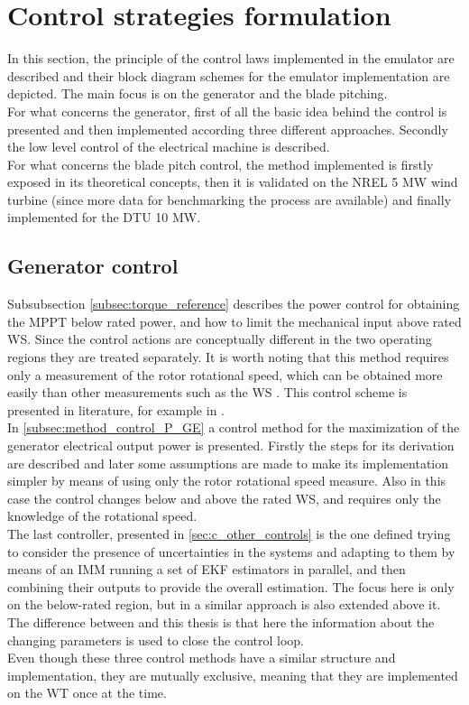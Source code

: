 \newpage
\section{Control strategies formulation}\label{sec:c_basic_model_control}
In this section, the principle of the control laws implemented in the emulator are described and their block diagram schemes for the emulator implementation are depicted. The main focus is on the generator and the blade pitching. \\
For what concerns the generator, first of all the basic idea behind the control is presented and then implemented according three different approaches. Secondly the low level control of the electrical machine is described.\\
For what concerns the blade pitch control, the method implemented is firstly exposed in its theoretical concepts, then it is validated on the NREL 5 MW wind turbine (since more data for benchmarking the process are available) and finally implemented for the DTU 10 MW.   

\subsection{Generator control}
Subsubsection \ref{subsec:torque_reference} describes the power control for obtaining the MPPT below rated power, and how to limit the mechanical input above rated WS. Since the control actions are conceptually different in the two operating regions they are treated separately. It is worth noting that this method requires only a measurement of the rotor rotational speed, which can be obtained more easily than other measurements such as the WS \cite{kalman_based_IMM}. This control scheme is presented in literature, for example in \cite{DTU_Wind_Energy_E_0028}. \\
In \autoref{subsec:method_control_P_GE} a control method for the maximization of the generator electrical output power is presented. Firstly the steps for its derivation are described and later some assumptions are made to make its implementation simpler by means of using only the rotor rotational speed measure. Also in this case the control changes below and above the rated WS, and requires only the knowledge of the rotational speed.\\
The last controller, presented in \autoref{sec:c_other_controls} is the one defined trying to consider the presence of uncertainties in the systems and adapting to them by means of an IMM running a set of \acrfull{EKF} estimators in parallel, and then combining their outputs to provide the overall estimation. The focus here is only on the below-rated region, but in \cite{kalman_based_IMM} a similar approach is also extended above it. The difference between \cite{kalman_based_IMM} and this thesis is that here the information about the changing parameters is used to close the control loop. \\
Even though these three control methods have a similar structure and implementation, they are mutually exclusive, meaning that they are implemented on the WT once at the time.

